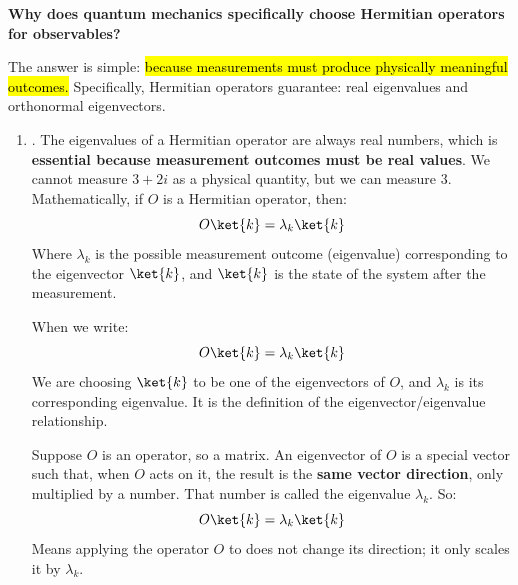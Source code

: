 \begin{flushleft}
    \textcolor{Green3}{ \textbf{Why does quantum mechanics specifically choose Hermitian operators for observables?}}
\end{flushleft}
The answer is simple: \hl{because measurements must produce physically meaningful outcomes.} Specifically, Hermitian operators guarantee: real eigenvalues and orthonormal eigenvectors.
\begin{enumerate}
    \item {}. The eigenvalues of a Hermitian operator are always real numbers, which is \textbf{essential because measurement outcomes must be real values}. We cannot measure $3 + 2i$ as a physical quantity, but we can measure $3$. Mathematically, if $O$ is a Hermitian operator, then:
    \begin{equation*}
        O\ket{k} = \lambda_k \ket{k}
    \end{equation*}
    Where $\lambda_k$ is the possible measurement outcome (eigenvalue) corresponding to the eigenvector $\ket{k}$, and $\ket{k}$ is the state of the system after the measurement.
    \begin{remarkbox}
        When we write:
        \begin{equation*}
            O\ket{k}=\lambda_k\ket{k}
        \end{equation*}
        We are choosing $\ket{k}$ to be one of the eigenvectors of $O$, and $\lambda_k$ is its corresponding eigenvalue. It is the definition of the eigenvector/eigenvalue relationship.

        \highspace
        Suppose $O$ is an operator, so a matrix. An eigenvector  of $O$ is a special vector such that, when $O$ acts on it, the result is the \textbf{same vector direction}, only multiplied by a number. That number is called the eigenvalue $\lambda_k$. So:
        \begin{equation*}
            O\ket{k} = \lambda_k \ket{k}
        \end{equation*}
        Means applying the operator $O$ to  does not change its direction; it only scales it by $\lambda_k$.


\end{remarkbox}
\end{enumerate}
